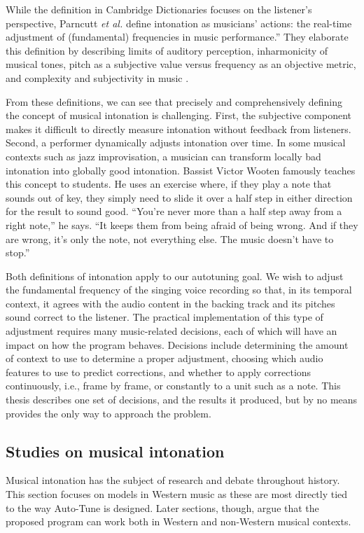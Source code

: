 While the definition in Cambridge Dictionaries focuses on the listener's perspective, Parncutt \textit{et al.} define intonation as musicians' actions: the real-time adjustment of (fundamental) frequencies in music performance.'' They elaborate this definition by describing limits of auditory perception, inharmonicity of musical tones, pitch as a subjective value versus frequency as an objective metric, and complexity and subjectivity in music \cite{parncutt2018psychocultural}.

From these definitions, we can see that precisely and comprehensively defining the concept of musical intonation is challenging. First, the subjective component makes it difficult to directly measure intonation without feedback from listeners. Second, a performer dynamically adjusts intonation over time. In some musical contexts such as jazz improvisation, a musician can transform locally bad intonation into globally good intonation. Bassist Victor Wooten famously teaches this concept to students. He uses an exercise where, if they play a note that sounds out of key, they simply need to slide it over a half step in either direction for the result to sound good. ``You’re never more than a half step away from a right note,'' he says. ``It keeps them from being afraid of being wrong. And if they are wrong, it’s only the note, not everything else. The music doesn’t have to stop.'' \cite{Freddy2020}

Both definitions of intonation apply to our autotuning goal. We wish to adjust the fundamental frequency of the singing voice recording so that, in its temporal context, it agrees with the audio content in the backing track and its pitches sound correct to the listener. The practical implementation of this type of adjustment requires many music-related decisions, each of which will have an impact on how the program behaves. Decisions include determining the amount of context to use to determine a proper adjustment, choosing which audio features to use to predict corrections, and whether to apply corrections continuously, i.e., frame by frame, or constantly to a unit such as a note. This thesis describes one set of decisions, and the results it produced, but by no means provides the only way to approach the problem.

\subsection{Studies on musical intonation}
Musical intonation has the subject of research and debate throughout history. This section focuses on models in Western music as these are most directly tied to the way Auto-Tune is designed. Later sections, though, argue that the proposed program can work both in Western and non-Western musical contexts. 

